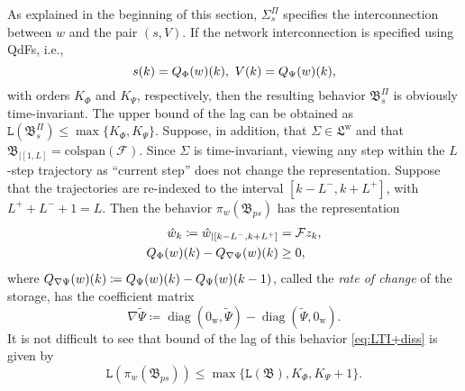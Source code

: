 \documentclass[11pt,print,draftcls,onecolumn,romanappendices]{ieeecolor}
\DeclareMathOperator{\diag}{diag}
\newcommand{\LTI}[1]{\mathfrak{L}^{#1}}
\newcommand{\lag}[1]{\mathtt{L}\left(#1\right)}
\newcommand{\proj}[2]{\pi_{#1}\left(#2\right)}
\newcommand{\revise}[1]{{\color{black} #1}}
\newcommand{\B}{\mathfrak{B}}
\newcommand{\F}{\mathcal{F}}
\newcommand{\bint}[1]{{|[#1]}}
\begin{document}
As explained in the beginning of this section, $\Sigma_{s}^\Pi$ specifies the interconnection between $w$ and the pair $(s,V)$. If the network interconnection is specified using QdFs, i.e.,
\begin{equation}\label{eq:dissnetwork}
	s\revise{(k)}=Q_\Phi(w)\revise{(k)}, \ V\revise{(k)}=Q_\Psi(w)\revise{(k)},
\end{equation}
with orders $K_\Phi$ and $K_\Psi$, respectively, then the resulting behavior $\B_{s}^\Pi$ is obviously time-invariant. The upper bound of the lag can be obtained as $\lag{\B_{s}^\Pi}\leq\max\{K_\Phi,K_\Psi\}$. Suppose, in addition, that $\Sigma\in\LTI{\mathrm{w}}$ and that $\B_{\bint{1,L}}=\mathrm{colspan}\left(\F\right)$. Since $\Sigma$ is time-invariant, viewing any step within the $L$-step trajectory as ``current step'' does not change the representation. Suppose that the trajectories are re-indexed to the interval $[k-L^-,k+L^+]$, with $L^++L^-+1=L$. Then the behavior $\proj{w}{\B_{ps}}$ has the representation
\begin{subequations}\label{eq:LTI+diss}
	\begin{align}
		\hat{w}_{k}\coloneqq\hat{w}_{\bint{k-L^-,k+L^+}}&=\F z_{k},\label{eq:LTI+diss1}\\
		Q_{\Phi}(w)\revise{(k)}-Q_{\nabla\Psi}(w)\revise{(k)}&\geq0 ,\label{eq:LTI+diss2}
	\end{align}
\end{subequations}
where $Q_{\nabla\Psi}(w)\revise{(k)}\coloneqq Q_{\Psi}(w)\revise{(k)}-Q_{\Psi}(w)\revise{(k-1)}$, called the \emph{rate of change} of the storage, has the coefficient matrix
\begin{equation}
	\nabla\widetilde{\Psi}\coloneqq\diag(0_\mathrm{w},\widetilde{\Psi})-\diag(\widetilde{\Psi},0_\mathrm{w}).
\end{equation}
It is not difficult to see that bound of the lag of this behavior \eqref{eq:LTI+diss} is given by
\begin{equation}\label{eq:lagdissproj}
	\lag{\proj{w}{\B_{ps}}}\leq\max\{\lag{\B},K_\Phi,K_\Psi+1\}.
\end{equation}
\end{document}
